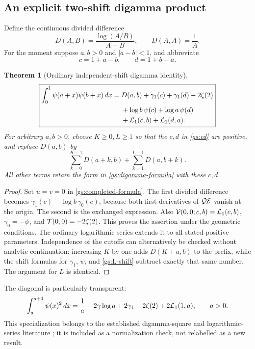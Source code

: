 \documentclass[11pt,letterpaper]{article}
\numberwithin{equation}{section}
\newtheorem{theorem}{Theorem}[section]
\theoremstyle{definition}
\theoremstyle{remark}
\begin{document}
\subsection{An explicit two-shift digamma product}

Define the continuous divided difference
\[
 D(A,B)=\frac{\log(A/B)}{A-B},\qquad D(A,A)=\frac1A.
\]
For the moment suppose $a,b>0$ and $|a-b|<1$, and abbreviate
\[
 c=1+a-b,\qquad d=1+b-a.
\]

\begin{theorem}[Ordinary independent-shift digamma identity]
\label{gs:digamma}
\begin{align}
 \boxed{\begin{aligned}
 \int_0^1\psi(a+x)\psi(b+x)\,dx
 ={}&D(a,b)+\gamma_1(c)+\gamma_1(d)-2\zeta(2)\\
 &+\log b\,\psi(c)+\log a\,\psi(d)\\
 &+\mathcal L_1(c,b)+\mathcal L_1(d,a).
 \end{aligned}}
 \label{gs:digamma-formula}
\end{align}
For arbitrary $a,b>0$, choose $K\ge0,L\ge1$ so that the $c,d$ in
\eqref{gs:cd} are positive, and replace $D(a,b)$ by
\[
 \sum_{k=0}^{K-1}D(a+k,b)+\sum_{k=1}^{L-1}D(a,b+k).
\]
All other terms retain the form in \eqref{gs:digamma-formula} with
these $c,d$.
\end{theorem}

\begin{proof}
Set $u=v=0$ in \eqref{gs:completed-formula}.
The first divided difference becomes
$\gamma_1(c)-\log b\,\gamma_0(c)$, because both first derivatives
of $\mathcal Q\mathcal E$ vanish at the origin.  The second is the exchanged
expression.  Also $\mathcal V(0,0;c,b)=\mathcal L_1(c,b)$,
$\gamma_0=-\psi$, and $\mathcal T(0,0)=-2\zeta(2)$.
This proves the assertion under the geometric conditions.
The ordinary logarithmic series extends it to all stated positive
parameters.  Independence of the cutoffs can alternatively be checked
without analytic continuation: increasing $K$ by one adds
$D(K+a,b)$ to the prefix, while the shift formulas for $\gamma_1$,
$\psi$, and \eqref{gs:L-shift} subtract exactly that same number.
The argument for $L$ is identical.
\end{proof}

The diagonal is particularly transparent:
\begin{equation}\label{gs:diagonal-digamma}
 \int_a^{a+1}\psi(x)^2\,dx
 =\frac1a-2\gamma\log a+2\gamma_1-2\zeta(2)
                         +2\mathcal L_1(1,a),\qquad a>0.
\end{equation}
This specialization belongs to the established digamma-square and
logarithmic-series literature \cite{Connon}; it is included as a
normalization check, not relabelled as a new result.
\end{document}
